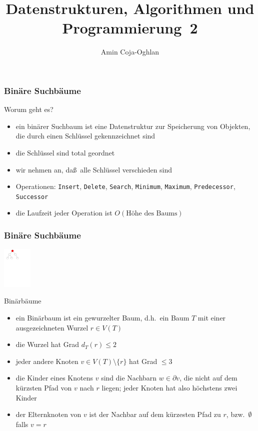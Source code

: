\documentclass[aspectratio=1610, 11pt]{beamer}
\title{Datenstrukturen, Algorithmen und Programmierung~2}
\author[A.~Coja-Oghlan]{Amin Coja-Oghlan}
\institute[DAP2]{Lehrstuhl Informatik 2\\Fakult\"at f\"ur Informatik}
\newcommand{\mytitle}{Bin\"are Suchb\"aume}
\begin{document}
\frame[plain]{\titlepage}

\begin{frame}\frametitle{\mytitle}
	\begin{exampleblock}{Worum geht es?}
		\begin{itemize}
			\item ein bin\"arer Suchbaum ist eine Datenstruktur zur Speicherung von Objekten, die durch einen Schl\"ussel gekennzeichnet sind
			\item die Schl\"ussel sind total geordnet
			\item wir nehmen an, da\ss\ alle Schl\"ussel verschieden sind
			\item \alert{Operationen:} {\tt Insert}, {\tt Delete}, {\tt Search}, {\tt Minimum}, {\tt Maximum}, {\tt Predecessor}, {\tt Successor}
			\item die Laufzeit jeder Operation ist $O(\mbox{H\"ohe des Baums})$
		\end{itemize}
	\end{exampleblock}
\end{frame}

\begin{frame}\frametitle{\mytitle}
	\hfill\includegraphics[height=20mm]{./images/binary_tree.pdf}
	\begin{exampleblock}{Bin\"arb\"aume}
		\begin{itemize}
			\item ein \alert{Bin\"arbaum} ist ein gewurzelter Baum, d.h.\ ein Baum $T$ mit einer ausgezeichneten Wurzel $r\in V(T)$
			\item die Wurzel hat Grad $d_T(r)\leq2$
			\item jeder andere Knoten $v\in V(T)\setminus\{r\}$ hat Grad $\leq3$
			\item die \alert{Kinder} eines Knotens $v$ sind die Nachbarn $w\in\partial v$, die nicht auf dem k\"urzsten Pfad von $v$ nach $r$ liegen; jeder Knoten hat also h\"ochstens zwei Kinder
			\item der \alert{Elternknoten} von $v$ ist der Nachbar auf dem k\"urzesten Pfad zu $r$, bzw.\ $\emptyset$ falls $v=r$
		\end{itemize}
	\end{exampleblock}
\end{frame}
\end{document}

